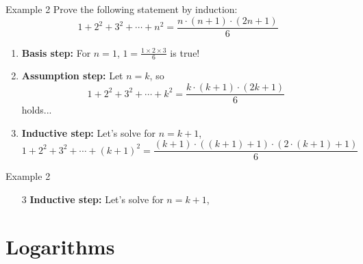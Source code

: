 \documentclass{beamer}
\theoremstyle{definition}
\begin{document}
\begin{frame}{Example 2}
Prove the following statement by induction:
$$ 1 + 2^2 + 3^2 + \cdots + n^2 = \frac{n \cdot (n + 1) \cdot (2n + 1)}{6} $$
    \begin{enumerate}[<+->]
        \item \textbf{Basis step:} For $n = 1$, $1 = \frac {1 \times 2 \times 3}{6}$ is true!
        \item \textbf{Assumption step:} Let $n = k$, so $$ 1 + 2^2 + 3^2 + \cdots + k^2 = \frac{k \cdot (k + 1) \cdot (2k + 1)}{6} $$ holds...
        \item \textbf{Inductive step:} Let's solve for $n = k + 1$,
        $$ 1 + 2^2 + 3^2 + \cdots + (k + 1)^2 = \frac{(k + 1) \cdot ((k + 1) + 1) \cdot (2 \cdot (k + 1) + 1)}{6} $$
    \end{enumerate}
\end{frame}

\begin{frame}{Example 2}
    \begin{enumerate}
        \item[3] \textbf{Inductive step:} Let's solve for $n = k + 1$,
        { \small
        }
    \end{enumerate}
\end{frame}

\section{Logarithms}
\end{document}
